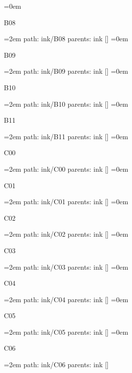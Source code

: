\smallskip
\leftskip=0em
\par\endgroup
\bigskip
{}
B08
\smallskip
\par\begingroup
\leftskip=2em
path: ink/B08
\smallskip
parents:  ink []
\smallskip
\leftskip=0em
\par\endgroup
\bigskip
{}
B09
\smallskip
\par\begingroup
\leftskip=2em
path: ink/B09
\smallskip
parents:  ink []
\smallskip
\leftskip=0em
\par\endgroup
\bigskip
{}
B10
\smallskip
\par\begingroup
\leftskip=2em
path: ink/B10
\smallskip
parents:  ink []
\smallskip
\leftskip=0em
\par\endgroup
\bigskip
{}
B11
\smallskip
\par\begingroup
\leftskip=2em
path: ink/B11
\smallskip
parents:  ink []
\smallskip
\leftskip=0em
\par\endgroup
\bigskip
{}
C00
\smallskip
\par\begingroup
\leftskip=2em
path: ink/C00
\smallskip
parents:  ink []
\smallskip
\leftskip=0em
\par\endgroup
\bigskip
{}
C01
\smallskip
\par\begingroup
\leftskip=2em
path: ink/C01
\smallskip
parents:  ink []
\smallskip
\leftskip=0em
\par\endgroup
\bigskip
{}
C02
\smallskip
\par\begingroup
\leftskip=2em
path: ink/C02
\smallskip
parents:  ink []
\smallskip
\leftskip=0em
\par\endgroup
\bigskip
{}
C03
\smallskip
\par\begingroup
\leftskip=2em
path: ink/C03
\smallskip
parents:  ink []
\smallskip
\leftskip=0em
\par\endgroup
\bigskip
{}
C04
\smallskip
\par\begingroup
\leftskip=2em
path: ink/C04
\smallskip
parents:  ink []
\smallskip
\leftskip=0em
\par\endgroup
\bigskip
{}
C05
\smallskip
\par\begingroup
\leftskip=2em
path: ink/C05
\smallskip
parents:  ink []
\smallskip
\leftskip=0em
\par\endgroup
\bigskip
{}
C06
\smallskip
\par\begingroup
\leftskip=2em
path: ink/C06
\smallskip
parents:  ink []

